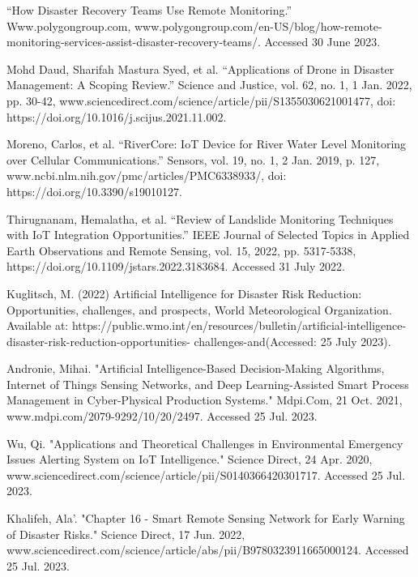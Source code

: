 \documentclass[conference]{IEEEtran}
\begin{document}
\begin{thebibliography}{00}
     ``How Disaster Recovery Teams Use Remote Monitoring.'' Www.polygongroup.com, 
        www.polygongroup.com/en-US/blog/how-remote-monitoring-services-assist-disaster-recovery-teams/. 
        Accessed 30 June 2023.

     Mohd Daud, Sharifah Mastura Syed, et al. ``Applications of Drone in Disaster Management: 
        A Scoping Review.'' Science and Justice, vol. 62, no. 1, 1 Jan. 2022, pp. 30-42, 
        www.sciencedirect.com/science/article/pii/S1355030621001477, 
        doi: https://doi.org/10.1016/j.scijus.2021.11.002.
    
     Moreno, Carlos, et al. ``RiverCore: IoT Device for River Water Level Monitoring over
        Cellular Communications.'' Sensors, vol. 19, no. 1, 2 Jan. 2019, p. 127, 
        www.ncbi.nlm.nih.gov/pmc/articles/PMC6338933/, doi: https://doi.org/10.3390/s19010127.
    
     Thirugnanam, Hemalatha, et al. ``Review of Landslide Monitoring Techniques with IoT 		
        Integration Opportunities.'' IEEE Journal of Selected Topics in Applied Earth Observations and Remote 
        Sensing, vol. 15, 2022, pp. 5317-5338, https://doi.org/10.1109/jstars.2022.3183684. Accessed 31 July 
        2022.
    
     Kuglitsch, M. (2022) Artificial Intelligence for Disaster Risk Reduction: Opportunities, 
        challenges, and prospects, World Meteorological Organization. Available at: 
        https://public.wmo.int/en/resources/bulletin/artificial-intelligence-disaster-risk-reduction-opportunities-
        challenges-and(Accessed: 25 July 2023). 

     Andronie, Mihai. "Artificial Intelligence-Based Decision-Making Algorithms, Internet of 
        Things Sensing Networks, and Deep Learning-Assisted Smart Process Management in Cyber-Physical Production 
        Systems." Mdpi.Com, 21 Oct. 2021, www.mdpi.com/2079-9292/10/20/2497. Accessed 25 Jul. 2023.

     Wu, Qi. "Applications and Theoretical Challenges in Environmental Emergency Issues Alerting 
        System on IoT Intelligence." Science Direct, 24 Apr. 2020, 
        www.sciencedirect.com/science/article/pii/S0140366420301717. Accessed 25 Jul. 2023.

     Khalifeh, Ala’. "Chapter 16 - Smart Remote Sensing Network for Early Warning of Disaster 
        Risks." Science Direct, 17 Jun. 2022, www.sciencedirect.com/science/article/abs/pii/B9780323911665000124. 
        Accessed 25 Jul. 2023.


\end{thebibliography}
\end{document}
